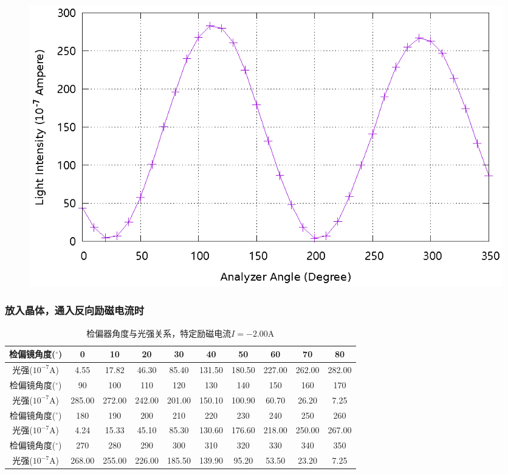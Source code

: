\documentclass{ctexart}
\newcommand{\si}[1]{\mathrm{#1}}
\let\oldsubsubsection\subsubsection
\renewcommand{\subsubsection}[1]{\oldsubsubsection{\!\!\!\!\!\!#1}}
\begin{document}
\begin{figure}[H]
    \centering
    \includegraphics[width=\linewidth]{optics-figures/analyzer-angle-light-intensity-3.gnuplot}
\end{figure}

\newpage
\subsubsection{放入晶体，通入反向励磁电流时}

\begin{table}[H]
  \centering
  \begin{tabular}{|c|c|c|c|c|c|c|c|c|c|}
    \hline
    检偏镜角度(${}^{\circ}$)  & 0   & 10  & 20  & 30  & 40  & 50  & 60  & 70  & 80  \\\hline
    光强($10^{-7} \si{A}$) & 4.55 & 17.82 & 46.30 & 85.40 & 131.50 & 180.50 & 227.00 & 262.00 & 282.00 \\\hline
    检偏镜角度(${}^{\circ}$)  & 90  & 100 & 110 & 120 & 130 & 140 & 150 & 160 & 170 \\\hline
    光强($10^{-7} \si{A}$) & 285.00 & 272.00 & 242.00 & 201.00 & 150.10 & 100.90 & 60.70 & 26.20 & 7.25 \\\hline
    检偏镜角度(${}^{\circ}$)  & 180 & 190 & 200 & 210 & 220 & 230 & 240 & 250 & 260 \\\hline
    光强($10^{-7} \si{A}$) & 4.24 & 15.33 & 45.10 & 85.30 & 130.60 & 176.60 & 218.00 & 250.00 & 267.00 \\\hline
    检偏镜角度(${}^{\circ}$)  & 270 & 280 & 290 & 300 & 310 & 320 & 330 & 340 & 350 \\\hline
    光强($10^{-7} \si{A}$) & 268.00 & 255.00 & 226.00 & 185.50 & 139.90 & 95.20 & 53.50 & 23.20 & 7.25 \\\hline
  \end{tabular}
  \caption{检偏器角度与光强关系，特定励磁电流$I=-2.00 \si{A}$}
\end{table}
\end{document}
